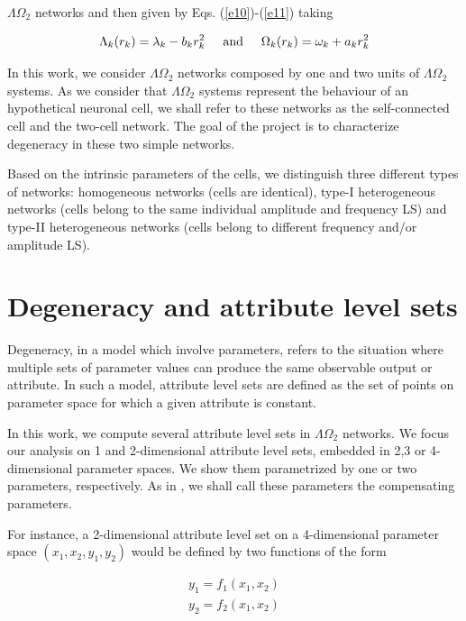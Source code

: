 $\Lambda \Omega_{2}$ networks and then given by Eqs. (\ref{e10})-(\ref{e11}) taking 

\begin{equation}
    \Lambda_{k}(r_{k}) = \lambda_{k} - b_{k}r_{k}^{2} \hspace{0.5cm} \text{and} \hspace{0.5cm} \Omega_{k}(r_{k}) = \omega_{k} + a_{k}r_{k}^{2}
    \label{e13}
\end{equation}

In this work, we consider $\Lambda \Omega_{2}$ networks composed by one and two units of $\Lambda \Omega_{2}$ systems. As we consider that $\Lambda \Omega_{2}$ systems represent the behaviour of an hypothetical neuronal cell, we shall refer to these networks as the self-connected cell and the two-cell network. The goal of the project is to characterize degeneracy in these two simple networks.

Based on the intrinsic parameters of the cells, we distinguish three different types of networks: homogeneous networks (cells are identical), type-I heterogeneous networks (cells belong to the same individual amplitude and frequency LS) and type-II heterogeneous networks (cells belong to different frequency and/or amplitude LS).

\section{Degeneracy and attribute level sets}
Degeneracy, in a model which involve parameters, refers to the situation where multiple sets of parameter values can produce the same observable output or attribute. In such a model, attribute level sets are defined as the set of points on parameter space for which a given attribute is constant.

In this work, we compute several attribute level sets in $\Lambda \Omega_{2}$ networks. We focus our analysis on 1 and 2-dimensional attribute level sets, embedded in 2,3 or 4-dimensional parameter spaces. We show them parametrized by one or two parameters, respectively. As in  \cite{Oly}, we shall call these parameters the compensating parameters. 

For instance, a 2-dimensional attribute level set on a 4-dimensional parameter space $(x_{1},x_{2},y_{1},y_{2})$ would be defined by two functions of the form

\begin{equation}
\begin{split}
    y_{1} = f_{1}(x_{1},x_{2})\\
    y_{2} = f_{2}(x_{1},x_{2})
    \end{split}
    \label{e14}
\end{equation}

